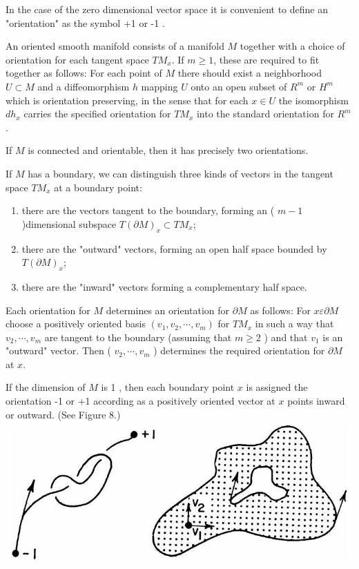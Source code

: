 \documentclass[10pt, letterpaper]{article}
\begin{document}
In the case of the zero dimensional vector space it is convenient to define an "orientation" as the symbol +1 or -1 .

An oriented smooth manifold consists of a manifold $M$ together with a choice of orientation for each tangent space $T M_{x}$. If $m \geq 1$, these are required to fit together as follows: For each point of $M$ there should exist a neighborhood $U \subset M$ and a diffeomorphism $h$ mapping $U$ onto an open subset of $R^{m}$ or $H^{m}$ which is orientation preserving, in the sense that for each $x \in U$ the isomorphism $d h_{x}$ carries the specified orientation for $T M_{x}$ into the standard orientation for $R^{m}$.

If $M$ is connected and orientable, then it has precisely two orientations.

If $M$ has a boundary, we can distinguish three kinds of vectors in the tangent space $T M_{x}$ at a boundary point:

\begin{enumerate}
  \item there are the vectors tangent to the boundary, forming an ( $m-1$ )dimensional subspace $T(\partial M)_{x} \subset T M_{x}$;
  \item there are the "outward" vectors, forming an open half space bounded by $T(\partial M)_{x}$;
  \item there are the "inward" vectors forming a complementary half space.
\end{enumerate}

Each orientation for $M$ determines an orientation for $\partial M$ as follows: For $x \varepsilon \partial M$ choose a positively oriented basis $\left(v_{1}, v_{2}, \cdots, v_{m}\right)$ for $T M_{x}$ in such a way that $v_{2}, \cdots, v_{m}$ are tangent to the boundary (assuming that $m \geq 2$ ) and that $v_{1}$ is an "outward" vector. Then ( $v_{2}, \cdots, v_{m}$ ) determines the required orientation for $\partial M$ at $x$.

If the dimension of $M$ is 1 , then each boundary point $x$ is assigned the orientation -1 or +1 according as a positively oriented vector at $x$ points inward or outward. (See Figure 8.)\\
\includegraphics[scale=0.2, center]{2025_05_28_7c9927389b272ddbc2c3g-38}
\end{document}
